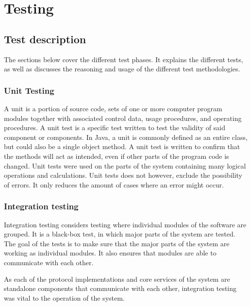 
\chapter{Testing}
\label{ch:testing}

\section{Test description}
\label{sec:testing-test_description}

The sections below cover the different test phases. It explains the different tests, as well as discusses the reasoning and usage of the different test methodologies.

\subsection{Unit Testing}
\label{subsec:testing-test_description-unit_testing}

A unit is a portion of source code, sets of one or more computer program modules together with associated control data, usage procedures, and operating procedures. A unit test is a specific test written to test the validity of said component or components. In Java, a unit is commonly defined as an entire class, but could also be a single object method. A unit test is written to confirm that the methods will act as intended, even if other parts of the program code is changed. Unit tests were used on the parts of the system containing many logical operations and calculations. Unit tests does not however, exclude the possibility of errors. It only reduces the amount of cases where an error might occur.

\subsection{Integration testing}
\label{subsec:testing-test_description-integration_testing}

Integration testing considers testing where individual modules of the software are grouped. It is a black-box test, in which major parts of the system are tested. The goal of the tests is to make sure that the major parts of the system are working as individual modules. It also ensures that modules are able to communicate with each other.

As each of the protocol implementations and core services of the system are standalone components that communicate with each other, integration testing was vital to the operation of the system. 

